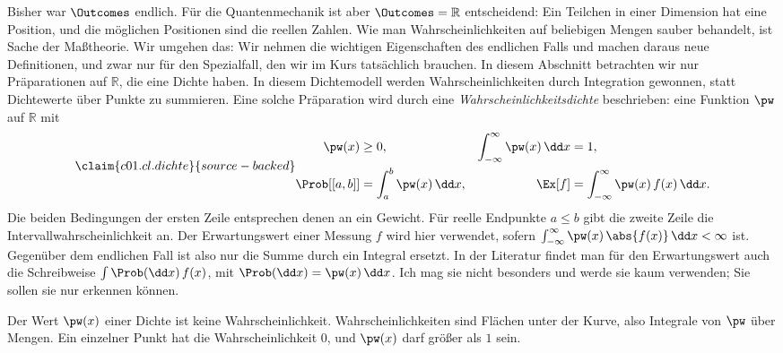 Bisher war $\Outcomes$ endlich. Für die Quantenmechanik ist aber
$\Outcomes = \mathbb{R}$ entscheidend: Ein Teilchen in einer Dimension hat eine Position,
und die möglichen Positionen sind die reellen Zahlen. Wie man Wahrscheinlichkeiten auf
beliebigen Mengen sauber behandelt, ist Sache der Maßtheorie. Wir umgehen das: Wir nehmen
die wichtigen Eigenschaften des endlichen Falls und machen daraus neue Definitionen, und zwar
nur für den Spezialfall, den wir im Kurs tatsächlich brauchen. In diesem Abschnitt betrachten wir
nur Präparationen auf $\mathbb{R}$, die eine Dichte haben. In diesem Dichtemodell werden
Wahrscheinlichkeiten durch Integration gewonnen, statt Dichtewerte über Punkte zu summieren.
Eine solche Präparation wird durch eine \emph{Wahrscheinlichkeitsdichte} beschrieben:
eine Funktion $\pw$ auf $\mathbb{R}$ mit
\begin{equation}\label{c01.eq.dichte}\claim{c01.cl.dichte}{source-backed}
  \begin{aligned}
    \pw(x) &\geq 0,
    &\int_{-\infty}^{\infty} \pw(x)\,\dd x &= 1, \\
    \Prob[[a,b]] &= \int_a^b \pw(x)\,\dd x,
    &\Ex[f] &= \int_{-\infty}^{\infty} \pw(x)\, f(x)\,\dd x .
  \end{aligned}
\end{equation}
Die beiden Bedingungen der ersten Zeile entsprechen denen an ein Gewicht. Für reelle
Endpunkte $a \leq b$ gibt die zweite Zeile die Intervallwahrscheinlichkeit an. Der
Erwartungswert einer Messung $f$ wird hier verwendet, sofern
$\int_{-\infty}^{\infty} \pw(x)\,\abs{f(x)}\,\dd x < \infty$ ist. Gegenüber dem
endlichen Fall ist also nur die Summe durch ein Integral ersetzt. In der Literatur findet man
für den Erwartungswert auch die Schreibweise $\int \Prob(\dd x)\, f(x)$, mit
$\Prob(\dd x) = \pw(x)\,\dd x$. Ich mag sie nicht besonders und werde sie kaum
verwenden; Sie sollen sie nur erkennen können.

\begin{merksatz}
  Der Wert $\pw(x)$ einer Dichte ist keine Wahrscheinlichkeit. Wahrscheinlichkeiten sind
  Flächen unter der Kurve, also Integrale von $\pw$ über Mengen. Ein einzelner Punkt hat
  die Wahrscheinlichkeit $0$, und $\pw(x)$ darf größer als $1$ sein.
\end{merksatz}


